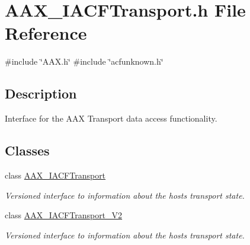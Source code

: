\hypertarget{a00557}{}\section{A\+A\+X\+\_\+\+I\+A\+C\+F\+Transport.\+h File Reference}
\label{a00557}
{\ttfamily \#include \char`\"{}A\+A\+X.\+h\char`\"{}}\newline
{\ttfamily \#include \char`\"{}acfunknown.\+h\char`\"{}}\newline


\subsection{Description}
Interface for the A\+AX Transport data access functionality. 

\subsection*{Classes}
\begin{DoxyCompactItemize}
\item 
class \mbox{\hyperlink{a01757}{A\+A\+X\+\_\+\+I\+A\+C\+F\+Transport}}
\begin{DoxyCompactList}\small\item\em Versioned interface to information about the host\textquotesingle{}s transport state. \end{DoxyCompactList}\item 
class \mbox{\hyperlink{a01761}{A\+A\+X\+\_\+\+I\+A\+C\+F\+Transport\+\_\+\+V2}}
\begin{DoxyCompactList}\small\item\em Versioned interface to information about the host\textquotesingle{}s transport state. \end{DoxyCompactList}\end{DoxyCompactItemize}

